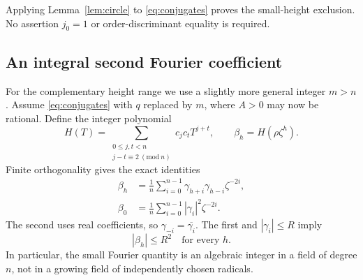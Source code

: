 \documentclass[11pt,letterpaper]{article}
\theoremstyle{remark}\newtheorem{remark}[theorem]{Remark}
\begin{document}
Applying Lemma~\ref{lem:circle} to \eqref{eq:conjugates} proves the
small-height exclusion. No assertion $j_0=1$ or order-discriminant equality
is required.

\subsection{An integral second Fourier coefficient}

For the complementary height range we use a slightly more general integer
$m>n$. Assume \eqref{eq:conjugates} with $q$ replaced by $m$, where
$A>0$ may now be rational. Define the integer polynomial
\begin{equation}\label{eq:autocorr}
 H(T)=\sum_{\substack{0\le j,t<n\\j-t\equiv2\ (\mathrm{mod}\ n)}}
                      c_jc_tT^{j+t},\qquad
 \beta_h=H(\rho\zeta^h).
\end{equation}
Finite orthogonality gives the exact identities
\begin{align}
 \beta_h&=\frac1n\sum_{i=0}^{n-1}
                    \gamma_{h+i}\gamma_{h-i}\zeta^{-2i},\label{eq:twist}\\
 \beta_0&=\frac1n\sum_{i=0}^{n-1}|\gamma_i|^2\zeta^{-2i}.
                                                        \label{eq:mode}
\end{align}
The second uses real coefficients, so $\gamma_{-i}=\overline{\gamma_i}$.
The first and $|\gamma_i|\le R$ imply
\begin{equation}\label{eq:allbounds}
                              |\beta_h|\le R^2
                  \quad\text{for every }h.
\end{equation}
In particular, the small Fourier quantity is an algebraic integer in a
field of degree $n$, not in a growing field of independently chosen radicals.
\end{document}
